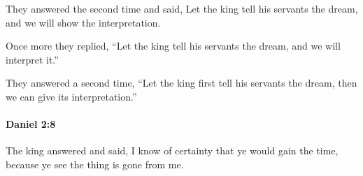 			\begin{versebox}
					\item[BHS] 
					\item[LXX] 
					\item[ASV] They answered the second time and said, Let the king tell his servants the dream, and we will show the interpretation.
					\item[NIV] Once more they replied, “Let the king tell his servants the dream, and we will interpret it.”
					\item[NRSV] They answered a second time, “Let the king first tell his servants the dream, then we can give its interpretation.”
			\end{versebox}

		\paragraph{Daniel 2:8} %
			\label{DANIEL-2-8}

			The king answered and said, I know of certainty that ye would gain the time, because ye see the thing is gone from me.

